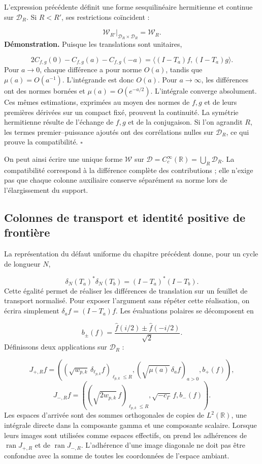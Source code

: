 L'expression précédente définit une forme sesquilinéaire hermitienne et continue sur \(\mathcal D_R\). Si \(R<R'\), ses restrictions coïncident :

\[
\mathscr W_{R'}|_{\mathcal D_R\times\mathcal D_R}=\mathscr W_R.
\]
\textbf{Démonstration.} Puisque les translations sont unitaires,

\[
2C_{f,g}(0)-C_{f,g}(a)-C_{f,g}(-a)
=\langle(I-T_a)f,(I-T_a)g\rangle.
\]
Pour \(a\to0\), chaque différence a pour norme \(O(a)\), tandis que \(\mu(a)=O(a^{-1})\). L’intégrande est donc \(O(a)\). Pour \(a\to\infty\), les différences ont des normes bornées et \(\mu(a)=O(e^{-a/2})\). L’intégrale converge absolument. Ces mêmes estimations, exprimées au moyen des normes de \(f,g\) et de leurs premières dérivées sur un compact fixé, prouvent la continuité. La symétrie hermitienne résulte de l’échange de \(f,g\) et de la conjugaison. Si l’on agrandit \(R\), les termes premier–puissance ajoutés ont des corrélations nulles sur \(\mathcal D_R\), ce qui prouve la compatibilité. \hfill\(\square\)

On peut ainsi écrire une unique forme \(\mathscr W\) sur \(\mathcal D=C_c^\infty(\mathbb R)=\bigcup_R\mathcal D_R\). La compatibilité correspond à la différence complète des contributions ; elle n'exige pas que chaque colonne auxiliaire conserve séparément sa norme lors de l'élargissement du support.

\subsection{Colonnes de transport et identité positive de frontière}
\label{viii:rz:columnas}
La représentation du défaut uniforme du chapitre précédent donne, pour un cycle de longueur \(N\),

\[
\delta_N(T_a)^*\delta_N(T_b)=(I-T_a)^*(I-T_b).
\]
Cette égalité permet de réaliser les différences de translation sur un feuillet de transport normalisé. Pour exposer l'argument sans répéter cette réalisation, on écrira simplement \(\delta_af=(I-T_a)f\). Les évaluations polaires se décomposent en

\[
b_\pm(f)=\frac{\widehat f(i/2)\pm\widehat f(-i/2)}{\sqrt2}.
\]
Définissons deux applications sur \(\mathcal D_R\) :

\[
J_{+,R}f=
\left(
(\sqrt{w_{p,k}}\,\delta_{\ell_{p,k}}f)_{\ell_{p,k}\leq R},
(\sqrt{\mu(a)}\,\delta_af)_{a>0},
b_+(f)
\right),
\]
\[
J_{-,R}f=
\left(
(\sqrt{2w_{p,k}}\,f)_{\ell_{p,k}\leq R},
\sqrt{-c_\Gamma}\,f,
b_-(f)
\right).
\]
Les espaces d'arrivée sont des sommes orthogonales de copies de \(L^2(\mathbb R)\), une intégrale directe dans la composante gamma et une composante scalaire. Lorsque leurs images sont utilisées comme espaces effectifs, on prend les adhérences de \(\operatorname{ran}J_{+,R}\) et de \(\operatorname{ran}J_{-,R}\). L'adhérence d'une image diagonale ne doit pas être confondue avec la somme de toutes les coordonnées de l'espace ambiant.

